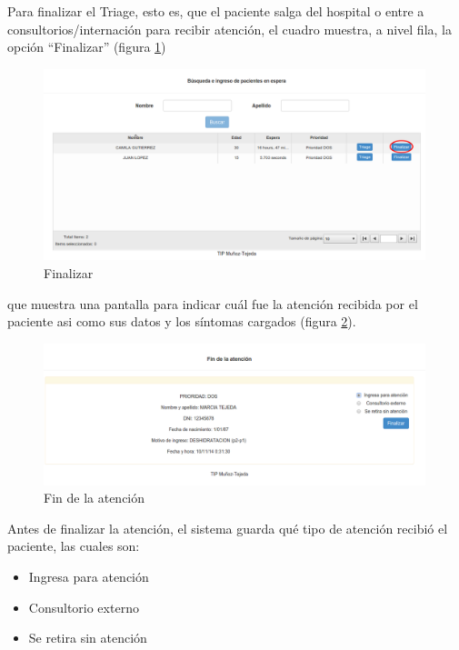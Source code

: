 Para finalizar el Triage, esto es, que el paciente salga del hospital o entre a consultorios/internación para recibir atención, el cuadro muestra, a nivel fila, la opción ``Finalizar'' (figura \ref{fig:espera2})
\begin{figure}
\centerline{\includegraphics[width=0.99\textwidth]{espera2.png}}
\caption{Finalizar} \label{fig:espera2}
\end{figure}
que muestra una pantalla para indicar cuál fue la atención recibida por el paciente asi como sus datos y los síntomas cargados (figura \ref{fig:fin_atencion}).
\begin{figure}
\centerline{\includegraphics[width=0.99\textwidth]{fin_atencion.png}}
\caption{Fin de la atención} \label{fig:fin_atencion}
\end{figure}

Antes de finalizar la atención, el sistema guarda qué tipo de atención recibió el paciente, las cuales son:

\begin{itemize}
\item Ingresa para atención
\item Consultorio externo
\item Se retira sin atención
\end{itemize}